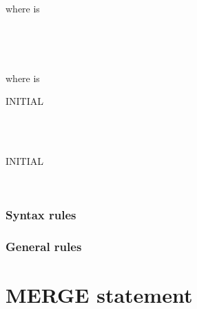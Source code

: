 where  is

\begin{syntax}
  \begin{1=}
    \identifier \\
    \literal
  \end{1=}
  \begin{1=}
    \identifier \\
    \literal
  \end{1=}
  \begin{0-1}
  \end{0-1}
\end{syntax}

where  is

\begin{syntax}
  \begin{0+}
     INITIAL
    \begin{1=}
      \identifier \\
      \literal
    \end{1=} \\

     INITIAL
    \begin{1=}
      \identifier \\
      \literal
    \end{1=}
  \end{0+}
\end{syntax}

\subsubsection{Syntax rules}

\subsubsection{General rules}

\section{MERGE statement}


